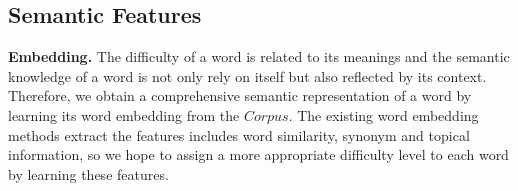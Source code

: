 \subsection{Semantic Features}
\textbf{Embedding.}
The difficulty of a word is related to its meanings and the semantic knowledge of a word is not only rely on itself but also reflected by its context. 
Therefore, we obtain a comprehensive semantic representation of a word by learning its word embedding from the $Corpus$.
The existing word embedding methods extract the features includes word similarity, synonym and topical information, so we hope to assign a more appropriate difficulty level to each word by learning these features.



